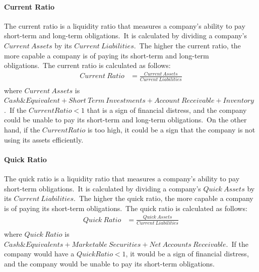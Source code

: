 \documentclass[../xlapes02]{subfiles}
\begin{document}
    \paragraph{Current Ratio}\label{par:current-ratio}
    The current ratio is a liquidity ratio that measures a company's ability to pay short-term and long-term obligations.\ It is calculated by dividing a company's $Current\ Assets$ by its $Current\ Liabilities$.\ The higher the current ratio, the more capable a company is of paying its short-term and long-term obligations.\ The current ratio is calculated as follows:
    \begin{equation}
        \label{eq:current-ratio}
        \begin{split}
            Current\ Ratio&=\frac{Current\ Assets}{Current\ Liabilities}\\
        \end{split}
    \end{equation}
    where $Current\ Assets$ is $Cash\&Equivalent+Short\ Term\ Investments+Account\ Receivable+Inventory$.\ If the $Current Ratio < 1$ that is a sign of financial distress, and the company could be unable to pay its short-term and long-term obligations.\ On the other hand, if the $Current Ratio$ is too high, it could be a sign that the company is not using its assets efficiently.

    \paragraph{Quick Ratio}\label{par:quick-ratio}
    The quick ratio is a liquidity ratio that measures a company's ability to pay short-term obligations.\ It is calculated by dividing a company's $Quick\ Assets$ by its $Current\ Liabilities$.\ The higher the quick ratio, the more capable a company is of paying its short-term obligations.\ The quick ratio is calculated as follows:
    \begin{equation}
        \label{eq:quick-ratio}
        \begin{split}
            Quick\ Ratio&=\frac{Quick\ Assets}{Current\ Liabilities}\\
        \end{split}
    \end{equation}
    where $Quick\ Ratio$ is $Cash\&Equivalents+Marketable\ Securities+Net\ Accounts\ Receivable$.\ If the company would have a $Quick Ratio < 1$, it would be a sign of financial distress, and the company would be unable to pay its short-term obligations.
\end{document}
